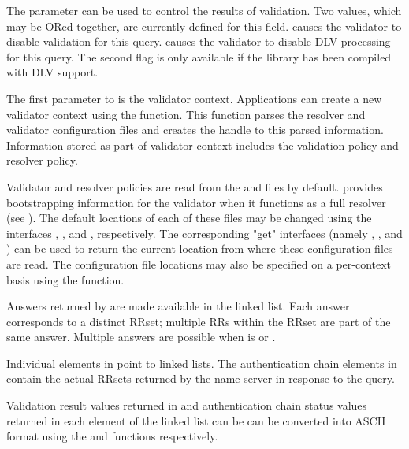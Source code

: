 The  parameter can be used to control the results of validation.
Two values, which may be ORed together, are currently defined for this field.
 causes the validator to disable
validation for this query.   causes the
validator to disable DLV processing for this query.  The second flag is only
available if the  library has been compiled with DLV support.

The first parameter to  is the validator
context.  Applications can create a new validator context using the
 function.  This function parses the resolver and
validator configuration files and creates the handle  to this
parsed information.  Information stored as part of validator context includes
the validation policy and resolver policy.

Validator and resolver policies are read from the  and
 files by default.   provides
bootstrapping information for the validator when it functions as a full
resolver (see ).  The default locations of each of these
files may be changed using the interfaces ,
, and , respectively.  The
corresponding "get" interfaces (namely ,
, and ) can be used to
return the current location from where these configuration files are read.
The configuration file locations may also be specified on a per-context basis
using the  function.

Answers returned by  are made available in
the  linked list.  Each answer corresponds to a distinct RRset;
multiple RRs within the RRset are part of the same answer.  Multiple answers
are possible when  is  or .

Individual elements in  point to
 linked lists.  The authentication chain
elements in  contain the actual RRsets
returned by  the name server in response to the query.

Validation result values returned in  and
authentication chain status values returned in each element of the
 linked list can be can be converted into
ASCII format using the  and 
functions respectively.

